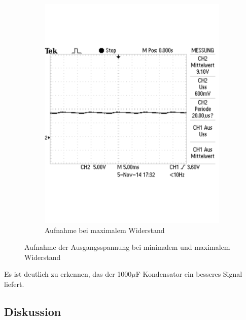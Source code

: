 \documentclass[12pt,a4paper]{article}
\begin{document}
\begin{figure}[H]
\begin{subfigure}[b]{0.48\textwidth}
                \includegraphics[width=\textwidth , scale = 0.4]{2_6_1000F_2.pdf}
                \caption[Aufnahme bei maximalem Widerstand]{Aufnahme bei maximalem Widerstand}
  				\label{fig:2_6_1000F_2}
        \end{subfigure}
        \caption{Aufnahme der Ausgangsspannung bei minimalem und maximalem Widerstand}
        \label{fig:2_6_1000F}
\end{figure}

Es ist deutlich zu erkennen, das der 1000$\mu$F Kondensator ein besseres Signal liefert.

\subsection{Diskussion}
\end{document}
